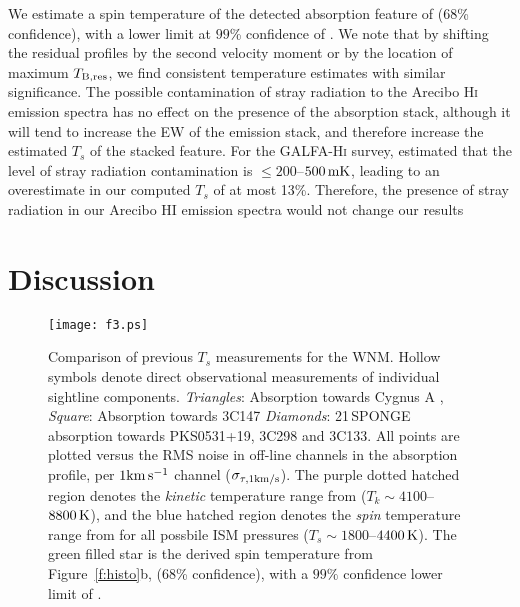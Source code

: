 \documentclass{aastex}
\begin{document}
We estimate a spin temperature of the detected  
absorption feature of \StackedSpinTemp{} ($68$\% confidence), 
with a lower limit at $99$\% confidence of \LowLimit{}.
We note that by shifting the residual profiles by the 
second velocity moment or by the location of maximum 
$T_{\rm B,res}$, we find consistent temperature estimates 
with similar significance. 
The possible contamination of stray radiation to 
the Arecibo H\textsc{i} emission spectra
has no effect on the presence of the absorption
stack, although it will tend to increase the EW of the
emission stack, and therefore increase the estimated
$T_s$  of the stacked feature. For the GALFA-H\textsc{i} 
survey, \citet{GALFA} estimated that the level of stray radiation contamination
is $\leq 200$--$500\rm\,mK$, leading to an overestimate in
our computed $T_s$ of at most 13\%. 
Therefore, the presence of stray radiation in our Arecibo HI emission spectra would
not change our results


\section{Discussion}
\label{s:discussion}

\begin{figure*}
    \centering
    \texttt{[image: f3.ps]}
    \caption{Comparison of previous $T_s$ 
         measurements for the WNM. Hollow symbols denote direct 
         observational measurements of individual sightline 
         components. \emph{Triangles}: Absorption towards Cygnus A 
         \citep{CDG98}, \emph{Square}: Absorption towards 
         3C147 \citep{DCG02} \emph{Diamonds}: 
         21\,SPONGE absorption towards PKS0531+19, 3C298 and 3C133.  All 
         points are plotted versus the RMS noise in off-line channels 
         in the absorption profile, per $1\rm km\,s^{-1}$ channel 
         ($\sigma_{\tau,1\rm km/s}$). The purple dotted hatched region 
         denotes the \emph{kinetic} temperature range from 
         \citet{Wolfire03} ($T_k\sim4100$--$8800\rm\,K$), and the 
         blue hatched region denotes the \emph{spin} temperature 
         range from \citet{Liszt01} for all 
         possbile ISM pressures ($T_s\sim1800$--$4400\rm\,K$). The 
         green filled star is the derived spin temperature from 
         Figure~\ref{f:histo}b, \StackedSpinTemp{} ($68$\% confidence),  with a 
         $99\%$ confidence lower limit of \LowLimit{}.}
    \label{f:temp}
\end{figure*}
\end{document}
